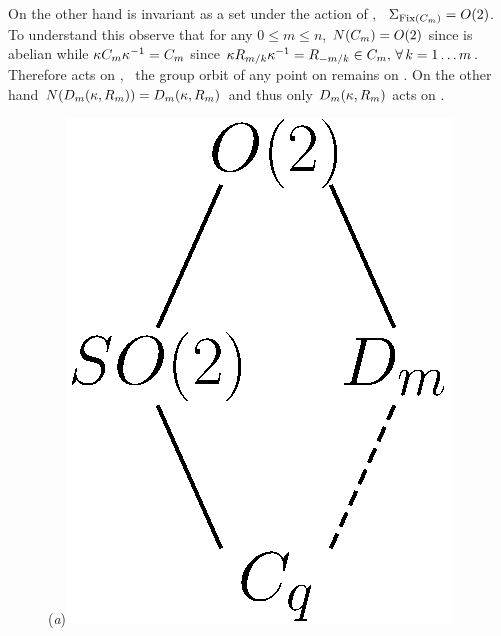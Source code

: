 \begin{example}
On the other hand  is invariant as a set under the action of , \ie\ $\Sigma_{\mathrm{Fix}\left(C_{m}\right)}=O(2)$.
To understand this observe that for any $0\le m\le n$, $N(C_{m})=O(2)$ 
since  is abelian while $\kappa C_{m} \kappa^{-1} = C_{m}$ since $\kappa R_{m/k}\kappa^{-1}=R_{-m/k}\in C_{m},\, \forall\, k=1\ldots m$. Therefore  acts on , \ie\ the group orbit of any point on  remains on .
On the other hand $N(D_{m}(\kappa,R_{m}))=D_{m}(\kappa,R_{m})$ and thus only $D_{m}(\kappa,R_{m})$ acts on .


\begin{figure}
\begin{center}
  (\textit{a})\includegraphics[height=0.15\textheight]{../figs/O2lattice}

\end{center}
\end{figure}
\end{example}
